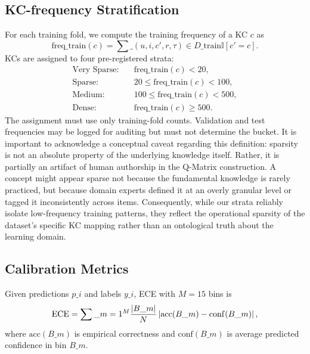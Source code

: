 \subsection{KC-frequency Stratification}
\label{sec:kc-strat}
For each training fold, we compute the training frequency of a KC $c$ as
\begin{equation}
\mathrm{freq}\_{\mathrm{train}}(c)=\sum\_{(u,i,c',r,\tau)\in D\_{\mathrm{train}}}\mathbb{I}[c'=c].
\end{equation}
KCs are assigned to four pre-registered strata:
\begin{align}
\text{Very Sparse:} &\quad \mathrm{freq}\_{\mathrm{train}}(c) < 20,\\
\text{Sparse:} &\quad 20 \le \mathrm{freq}\_{\mathrm{train}}(c) < 100,\\
\text{Medium:} &\quad 100 \le \mathrm{freq}\_{\mathrm{train}}(c) < 500,\\
\text{Dense:} &\quad \mathrm{freq}\_{\mathrm{train}}(c) \ge 500.
\end{align}
The assignment must use only training-fold counts. Validation and test frequencies may be logged for auditing but must not determine the bucket. It is important to acknowledge a conceptual caveat regarding this definition: sparsity is not an absolute property of the underlying knowledge itself. Rather, it is partially an artifact of human authorship in the Q-Matrix construction. A concept might appear sparse not because the fundamental knowledge is rarely practiced, but because domain experts defined it at an overly granular level or tagged it inconsistently across items. Consequently, while our strata reliably isolate low-frequency training patterns, they reflect the operational sparsity of the dataset's specific KC mapping rather than an ontological truth about the learning domain.

\subsection{Calibration Metrics}
Given predictions $p\_i$ and labels $y\_i$, ECE with $M=15$ bins is
\begin{equation}
\mathrm{ECE} = \sum\_{m=1}^{M}\frac{|B\_m|}{N}\left|\mathrm{acc}(B\_m)-\mathrm{conf}(B\_m)\right|,
\end{equation}
where $\mathrm{acc}(B\_m)$ is empirical correctness and $\mathrm{conf}(B\_m)$ is average predicted confidence in bin $B\_m$.

